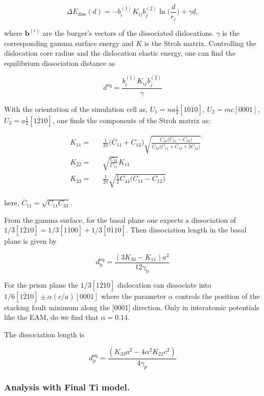 \documentclass[11pt]{article}
\begin{document}
\[ \Delta E_{\text{diss}}(d) = - b_i^{(1)}K_{ij}b_j^{(2)}\ln \big( \frac{d}{r_c}
   \big) + \gamma d,  \]

where \(\mathbf{b}^{(i)}\) are the burger's vectors of the dissociated
dislocations.  \(\gamma\) is the corresponding gamma surface energy and
\(K\) is the Stroh matrix. Controlling the dislocation core radius
and the dislocation elastic energy, one can find the equilibrium
dissociation distance as 

\[
   d^{\text{eq}} = \frac{ b_i^{(1)}K_{ij}b_j^{(2) }}{\gamma}
   \]


With the orientation of the simulation cell as, \(U_1 = na \frac{1}{2} [10\bar{1}0]\), \(U_2 = mc [0001]\), 
 \(U_3 =  a \frac{1}{3} [1\bar{2}10]\), one finds the components of
 the Stroh matrix as:

\begin{align}
&K_{11} =& &\frac{1}{2\pi} \big( \bar{C}_{11} + C_{13} \big)
      \sqrt{ \frac{ C_{44} \big( \bar{C}_{11} - C_{13} \big)  }{
	      C_{33} \big( \bar{C}_{11} + C_{13} + 2C_{44} \big)  } 
	   }
\\    
&K_{22 }=& &\sqrt{ \frac{ C_{33} }{ C_{11} }  } K_{11}
\\
&K_{33} =& &\frac{1}{2\pi} \sqrt{ \frac{1}{2} C_{44} \big( C_{11} - C_{12} \big)  }_{}
\end{align}

here, \(\bar{C}_{11} = \sqrt{ C_{11}C_{33} }\).


From the gamma surface, for the basal plane one expects a
dissociation of \(1/3[1\bar{2}10] = 1/3[1\bar{1}00] +
    1/3[0\bar{1}10]\). Then dissociation length in the basal plane is
given by 

\[
    d_{\text{b}}^{\text{eq}} = \frac{ ( 3K_{33} - K_{11} ) a^2 }{ 12 \gamma_{\text{b}} } 
    \]

For the prism plane the \(1/3[1\bar{2}10]\) dislocation can
dissociate into \(1/6[1\bar{2}10] \pm \alpha(c/a)[0001]\) where the
parameter \(\alpha\) controls the position of the stacking fault minimum
along the [0001] direction. Only in interatomic potentials like
the EAM, do we find that \(\alpha = 0.14\). 

The dissociation length is 

\[
    d_{\text{p}}^{\text{eq}} = \frac{ ( K_{33}a^2 - 4 \alpha^2 K_{22} c^2 ) }{ 4 \gamma_{p} }
    \]



\subsubsection{Analysis with Final Ti model.}
\label{sec:org8cf4630}
\end{document}
